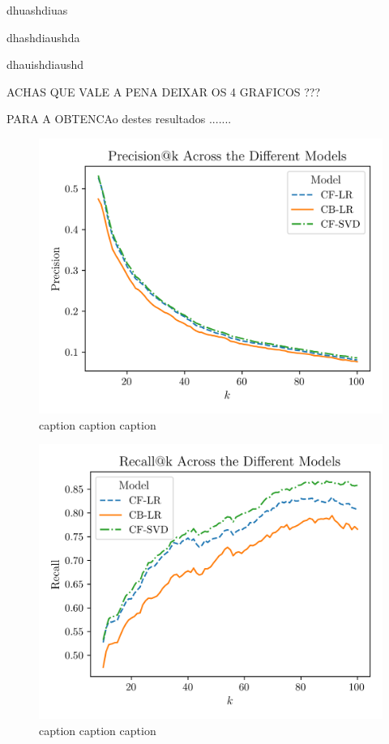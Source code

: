 \documentclass[conference]{IEEEtran}
\begin{document}
dhuashdiuas

dhashdiaushda

dhauishdiaushd

ACHAS QUE VALE A PENA DEIXAR OS 4 GRAFICOS ???

PARA A OBTENCAo destes resultados .......

\begin{figure}[H]
    \centering
    \includegraphics[width=1\linewidth]{assets/results_precisionK.png}
    \caption{caption caption caption}
    \label{fig:results_precisionK}
\end{figure}

\begin{figure}[H]
    \centering
    \includegraphics[width=1\linewidth]{assets/results_recallK.png}
    \caption{caption caption caption}
    \label{fig:results_recallK}
\end{figure}
\end{document}
